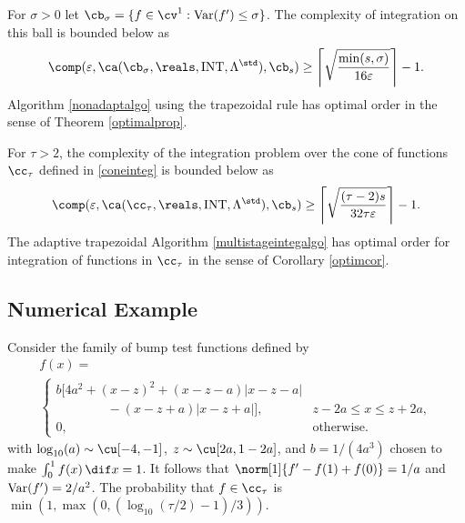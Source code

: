 \begin{theorem} \label{complowbdinteg} For $\sigma>0$ let $\cb_{\sigma}=\{f \in \cv^{1} : \Var(f') \le \sigma\}$.  The complexity of integration on this ball is bounded below as
\begin{equation*}
\comp(\varepsilon,\ca(\cb_{\sigma},\reals,\INT,\Lambda^{\std}),\cb_{s}) \ge \left \lceil \sqrt{\frac{\min(s,\sigma)}{16 \varepsilon}} \right \rceil -1 .
\end{equation*}
Algorithm \ref{nonadaptalgo} using the trapezoidal rule has optimal order in the sense of Theorem \ref{optimalprop}.

For $\tau>2$, the complexity of the integration problem over the cone of functions $\cc_{\tau}$ defined in \eqref{coneinteg} is bounded below as
\begin{equation*}
\comp(\varepsilon,\ca(\cc_{\tau},\reals,\INT,\Lambda^{\std}),\cb_{s}) \ge \left \lceil \sqrt{\frac{(\tau-2)s}{32 \tau \varepsilon}} \right \rceil -1 .
\end{equation*}
The adaptive trapezoidal Algorithm \ref{multistageintegalgo} has optimal order for integration of functions in $\cc_{\tau}$ in the sense of Corollary \ref{optimcor}.
\end{theorem}

\subsection{Numerical Example} \label{integnumexamplesec}

Consider the family of bump test functions defined by
\begin{multline}\label{testfun}
f(x)= \\
\begin{cases}
\displaystyle  b[4a^2 + (x-z)^2 + (x-z-a)|x-z-a|\\
\qquad \qquad -(x-z+a)|x-z+a|], & z-2a\leq x\leq z+2a,\\[2ex]
\displaystyle  0, & \text{otherwise}.
\end{cases}
\end{multline}
with  $\log_{10}(a) \sim \cu[-4,-1]$, $z \sim \cu[2a,1-2a]$, and $b=1/(4a^3)$ chosen to make $\int_0^1 f(x) \, \dif x = 1$.  It follows that $\norm[1]{f'-f(1)+f(0)}=1/a$ and $\operatorname{Var}(f')=2/a^2$.  The probability that $f \in \cc_{\tau}$ is $\min\left(1,\max(0,\left(\log_{10}(\tau/2)-1\right)/3)\right).$

